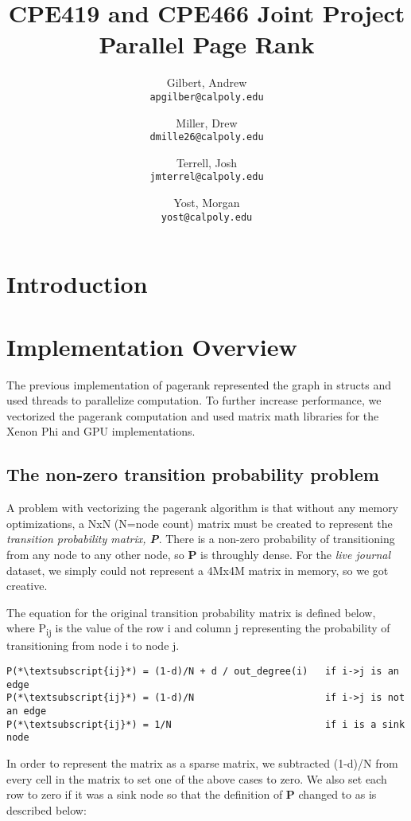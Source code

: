 \documentclass[draft]{report}
\title{CPE419 and CPE466 Joint Project\\Parallel Page Rank}
\author{
  Gilbert, Andrew\\
  \texttt{apgilber@calpoly.edu}
  \and
  Miller, Drew\\
  \texttt{dmille26@calpoly.edu}
  \and
  Terrell, Josh\\
  \texttt{jmterrel@calpoly.edu}
  \and
  Yost, Morgan\\
  \texttt{yost@calpoly.edu}
}
\date{}
\begin{document}
\maketitle

\begin{abstract}
\end{abstract}

\section{Introduction}

\section{Implementation Overview}
The previous implementation of pagerank represented the graph in structs and used threads to parallelize computation. To further increase performance, we vectorized the pagerank computation and used matrix math libraries for the Xenon Phi and GPU implementations.

\subsection{The non-zero transition probability problem}
A problem with vectorizing the pagerank algorithm is that without any memory optimizations, a NxN (N=node count) matrix must be created to represent the \textit{transition probability matrix, \textbf{P}}. There is a non-zero probability of transitioning from any node to any other node, so \textbf{P} is throughly dense. For the \textit{live journal} dataset, we simply could not represent a 4Mx4M matrix in memory, so we got creative.

The equation for the original transition probability matrix is defined below, where P\textsubscript{ij} is the value of the row i and column j representing the probability of transitioning from node i to node j.

\begin{lstlisting}
P(*\textsubscript{ij}*) = (1-d)/N + d / out_degree(i)   if i->j is an edge
P(*\textsubscript{ij}*) = (1-d)/N                       if i->j is not an edge
P(*\textsubscript{ij}*) = 1/N                           if i is a sink node
\end{lstlisting}

In order to represent the matrix as a sparse matrix, we subtracted (1-d)/N from every cell in the matrix to set one of the above cases to zero. We also set each row to zero if it was a sink node so that the definition of \textbf{P} changed to as is described below:
\end{document}
